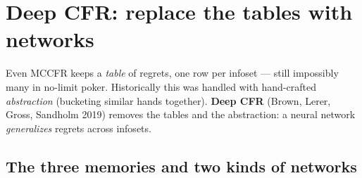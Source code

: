 \documentclass[11pt,a4paper]{article}
\begin{document}
\section{Deep CFR: replace the tables with networks}\label{sec:deepcfr}

Even MCCFR keeps a \emph{table} of regrets, one row per infoset --- still
impossibly many in no-limit poker. Historically this was handled with
hand-crafted \emph{abstraction} (bucketing similar hands together).
\textbf{Deep CFR} (Brown, Lerer, Gross, Sandholm 2019) removes the tables and
the abstraction: a neural network \emph{generalizes} regrets across infosets.

\subsection{The three memories and two kinds of networks}
\end{document}
